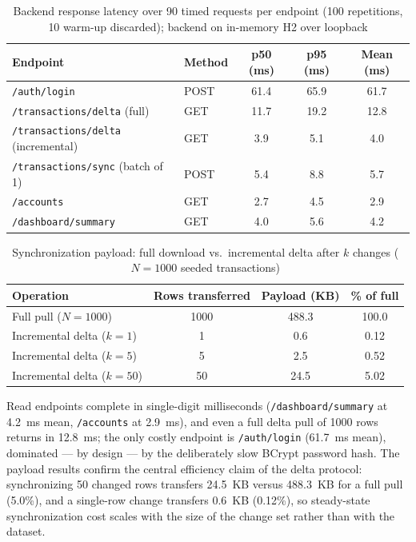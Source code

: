 \documentclass[13pt,a4paper]{extarticle}
\begin{document}
\begin{table}[H]
\centering
\caption{Backend response latency over 90 timed requests per endpoint (100 repetitions, 10 warm-up discarded); backend on in-memory H2 over loopback}
\label{tab:latency}
\renewcommand{\arraystretch}{1.2}
\begin{tabularx}{\textwidth}{@{}X l c c c@{}}
\toprule
\textbf{Endpoint} & \textbf{Method} & \textbf{p50 (ms)} & \textbf{p95 (ms)} & \textbf{Mean (ms)} \\
\midrule
\texttt{/auth/login}                          & POST & 61.4 & 65.9 & 61.7 \\
\texttt{/transactions/delta} (full)           & GET  & 11.7 & 19.2 & 12.8 \\
\texttt{/transactions/delta} (incremental)    & GET  & 3.9  & 5.1  & 4.0  \\
\texttt{/transactions/sync} (batch of 1)      & POST & 5.4  & 8.8  & 5.7  \\
\texttt{/accounts}                            & GET  & 2.7  & 4.5  & 2.9  \\
\texttt{/dashboard/summary}                   & GET  & 4.0  & 5.6  & 4.2  \\
\bottomrule
\end{tabularx}
\end{table}

\begin{table}[H]
\centering
\caption{Synchronization payload: full download vs.\ incremental delta after $k$ changes ($N=1000$ seeded transactions)}
\label{tab:payload}
\renewcommand{\arraystretch}{1.2}
\begin{tabularx}{\textwidth}{@{}X c c c@{}}
\toprule
\textbf{Operation} & \textbf{Rows transferred} & \textbf{Payload (KB)} & \textbf{\% of full} \\
\midrule
Full pull ($N=1000$)        & 1000 & 488.3 & 100.0 \\
Incremental delta ($k=1$)   & 1    & 0.6   & 0.12  \\
Incremental delta ($k=5$)   & 5    & 2.5   & 0.52  \\
Incremental delta ($k=50$)  & 50   & 24.5  & 5.02  \\
\bottomrule
\end{tabularx}
\end{table}

\noindent Read endpoints complete in single-digit milliseconds (\texttt{/dashboard/summary} at
4.2~ms mean, \texttt{/accounts} at 2.9~ms), and even a full delta pull of 1000 rows returns in
12.8~ms; the only costly endpoint is \texttt{/auth/login} (61.7~ms mean), dominated --- by design ---
by the deliberately slow BCrypt password hash. The payload results confirm the central efficiency
claim of the delta protocol: synchronizing 50 changed rows transfers 24.5~KB versus 488.3~KB for a
full pull (5.0\%), and a single-row change transfers 0.6~KB (0.12\%), so steady-state synchronization
cost scales with the size of the change set rather than with the dataset.
\end{document}
